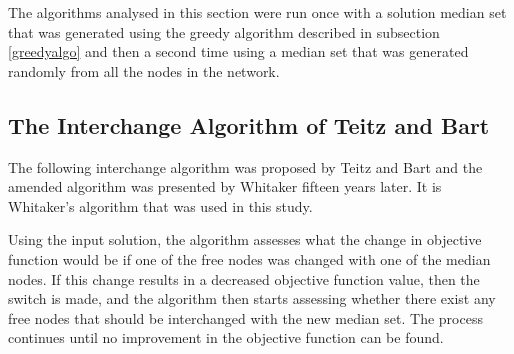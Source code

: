 \documentclass[11pt]{article}
\begin{document}
	The algorithms analysed in this section were run once with a solution median set that was generated using the greedy algorithm described in subsection \ref{greedyalgo} and then a second time using a median set that was generated randomly from all the nodes in the network.
	
	\subsection{The Interchange Algorithm of Teitz and Bart} \label{tbalgo} 
	The following interchange algorithm was proposed by Teitz and Bart \cite{TEIT68} and the amended algorithm was presented by Whitaker \cite{WHIT83} fifteen years later.  It is Whitaker's algorithm that was used in this study.
	
	Using the input solution, the algorithm assesses what the change in objective function would be if one of the free nodes was changed with one of the median nodes.  If this change results in a decreased objective function value, then the switch is made, and the algorithm then starts assessing whether there exist any free nodes that should be interchanged with the new median set.  The process continues until no improvement in the objective function can be found.
	
\end{document}
